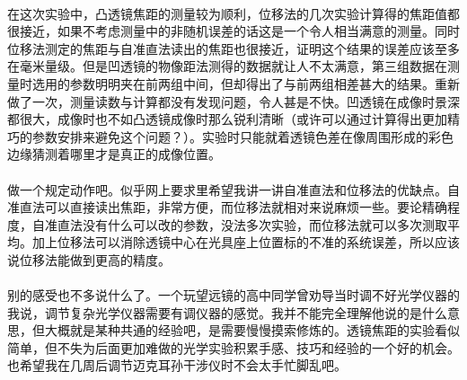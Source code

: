 \documentclass{article} %
\begin{document}
\paragraph{}
在这次实验中，凸透镜焦距的测量较为顺利，位移法的几次实验计算得的焦距值都很接近，如果不考虑测量中的非随机误差的话这是一个令人相当满意的测量。同时位移法测定的焦距与自准直法读出的焦距也很接近，证明这个结果的误差应该至多在毫米量级。但是凹透镜的物像距法测得的数据就让人不太满意，第三组数据在测量时选用的参数明明夹在前两组中间，但却得出了与前两组相差甚大的结果。重新做了一次，测量读数与计算都没有发现问题，令人甚是不快。凹透镜在成像时景深都很大，成像时也不如凸透镜成像时那么锐利清晰（或许可以通过计算得出更加精巧的参数安排来避免这个问题？）。实验时只能就着透镜色差在像周围形成的彩色边缘猜测着哪里才是真正的成像位置。

\paragraph{}
做一个规定动作吧。似乎网上要求里希望我讲一讲自准直法和位移法的优缺点。自准直法可以直接读出焦距，非常方便，而位移法就相对来说麻烦一些。要论精确程度，自准直法没有什么可以改的参数，没法多次实验，而位移法就可以多次测取平均。加上位移法可以消除透镜中心在光具座上位置标的不准的系统误差，所以应该说位移法能做到更高的精度。
\paragraph{}
别的感受也不多说什么了。一个玩望远镜的高中同学曾劝导当时调不好光学仪器的我说，调节复杂光学仪器需要有调仪器的感觉。我并不能完全理解他说的是什么意思，但大概就是某种共通的经验吧，是需要慢慢摸索修炼的。透镜焦距的实验看似简单，但不失为后面更加难做的光学实验积累手感、技巧和经验的一个好的机会。也希望我在几周后调节迈克耳孙干涉仪时不会太手忙脚乱吧。
\end{document}
